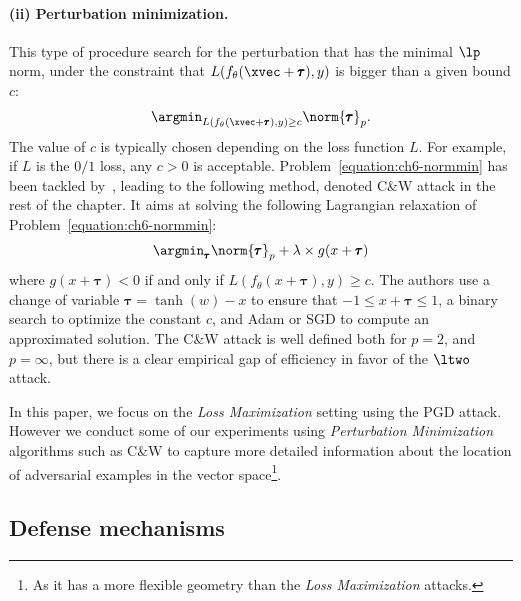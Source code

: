 \paragraph{(ii) Perturbation minimization.}
This type of procedure search for the perturbation that has the minimal $\lp$ norm, under the constraint that $L(f_\theta(\xvec + \pmb{\tau}), y)$ is bigger than a given bound $c$:
\begin{equation}
  \argmin_{L(f_\theta(\xvec + \pmb{\tau}), y) \geq c} \norm{\pmb{\tau}}_p.
  \label{equation:ch6-normmin}
\end{equation}
The value of $c$ is typically chosen depending on the loss function $L$. For example, if $L$ is the $0/1$ loss, any $c > 0$ is acceptable.
Problem~\ref{equation:ch6-normmin} has been tackled by~\citep{carlini2017towards}, leading to the following method, denoted C\&W attack in the rest of the chapter. It aims at solving the following Lagrangian relaxation of Problem~\ref{equation:ch6-normmin}:
\begin{equation}
  \argmin_{\pmb{\tau}} \norm{\pmb{\tau}}_p+ \lambda \times g(x+\pmb{\tau})
  \label{equation:ch6-CWproblem}
\end{equation}
where $g(x+\pmb{\tau})<0$ if and only if $L(f_\theta(x+\pmb{\tau}),y) \geq c$. 
The authors use a change of variable $\pmb{\tau}=\tanh(w)-x$ to ensure that $-1 \leq x+\pmb{\tau} \leq 1$, a binary search to optimize the constant $c$, and Adam or SGD to compute an approximated solution.
The C\&W attack is well defined both for $p=2$, and $p=\infty$, but there is a clear empirical gap of efficiency in favor of the $\ltwo$ attack.

In this paper, we focus on the \emph{Loss Maximization} setting using the PGD attack. However we conduct some of our experiments using \emph{Perturbation Minimization} algorithms such as C\&W to capture more detailed information about the location of adversarial examples in the vector space\footnote{As it has a more flexible geometry than the \emph{Loss Maximization} attacks.}. 

\subsection{Defense mechanisms}
\label{subsection:ch6-defense_mechanisms}

